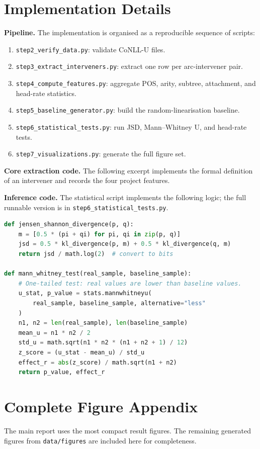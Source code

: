 \documentclass[11pt]{article}
\begin{document}
\clearpage
\appendix
\section{Implementation Details}
\textbf{Pipeline.} The implementation is organised as a reproducible sequence of scripts:
\begin{enumerate}
  \item \texttt{step2\_verify\_data.py}: validate CoNLL-U files.
  \item \texttt{step3\_extract\_interveners.py}: extract one row per arc-intervener pair.
  \item \texttt{step4\_compute\_features.py}: aggregate POS, arity, subtree, attachment, and head-rate statistics.
  \item \texttt{step5\_baseline\_generator.py}: build the random-linearisation baseline.
  \item \texttt{step6\_statistical\_tests.py}: run JSD, Mann--Whitney U, and head-rate tests.
  \item \texttt{step7\_visualizations.py}: generate the full figure set.
\end{enumerate}

\textbf{Core extraction code.} The following excerpt implements the formal definition of an intervener and records the four project features.


\textbf{Inference code.} The statistical script implements the following logic; the full runnable version is in \texttt{step6\_statistical\_tests.py}.
\begin{lstlisting}[language=Python]
def jensen_shannon_divergence(p, q):
    m = [0.5 * (pi + qi) for pi, qi in zip(p, q)]
    jsd = 0.5 * kl_divergence(p, m) + 0.5 * kl_divergence(q, m)
    return jsd / math.log(2)  # convert to bits

def mann_whitney_test(real_sample, baseline_sample):
    # One-tailed test: real values are lower than baseline values.
    u_stat, p_value = stats.mannwhitneyu(
        real_sample, baseline_sample, alternative="less"
    )
    n1, n2 = len(real_sample), len(baseline_sample)
    mean_u = n1 * n2 / 2
    std_u = math.sqrt(n1 * n2 * (n1 + n2 + 1) / 12)
    z_score = (u_stat - mean_u) / std_u
    effect_r = abs(z_score) / math.sqrt(n1 + n2)
    return p_value, effect_r
\end{lstlisting}

\clearpage
\section{Complete Figure Appendix}
The main report uses the most compact result figures. The remaining generated figures from \texttt{data/figures} are included here for completeness.
\end{document}
